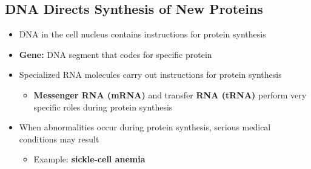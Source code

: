 \documentclass[12pt]{article}
\begin{document}
        \subsection{DNA Directs Synthesis of New Proteins}
            \begin{itemize}
                \item DNA in the cell nucleus contains instructions for protein synthesis
                \item \textbf{Gene:} DNA segment that codes for specific protein
                \item Specialized RNA molecules carry out instructions for protein synthesis
                    \begin{itemize}
                        \item \textbf{Messenger RNA (mRNA)} and transfer \textbf{RNA (tRNA)} perform very specific roles during protein synthesis
                    \end{itemize}
                \item When abnormalities occur during protein synthesis, serious medical conditions may result
                    \begin{itemize}
                        \item Example: \textbf{sickle-cell anemia}
                    \end{itemize}
            \end{itemize}
\end{document}

